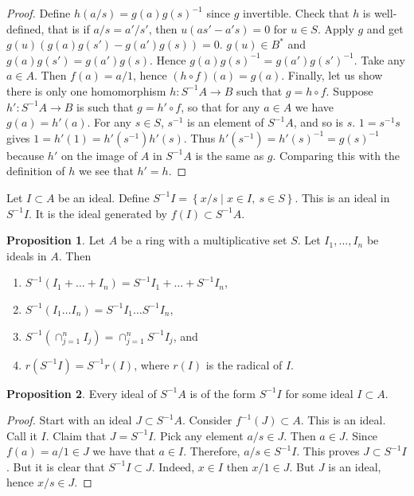 \documentclass{article}
\newcommand{\rb}[1]{\left( #1 \right)}
\newcommand{\cb}[1]{\left\{ #1 \right\}}
\theoremstyle{definition}\newtheorem{definition}{Definition}[section]
\theoremstyle{definition}\newtheorem{remark}[definition]{Remark}
\theoremstyle{definition}\newtheorem*{example}{Example}
\theoremstyle{definition}\newtheorem*{note}{Note}
\newtheorem{proposition}[definition]{Proposition}
\begin{document}
\begin{proof}
Define $ h\rb{a / s} = g\rb{a}g\rb{s}^{-1} $ since $ g $ invertible. Check that $ h $ is well-defined, that is if $ a / s = a' / s' $, then $ u\rb{as' - a's} = 0 $ for $ u \in S $. Apply $ g $ and get $ g\rb{u}\rb{g\rb{a}g\rb{s'} - g\rb{a'}g\rb{s}} = 0 $. $ g\rb{u} \in B^* $ and $ g\rb{a}g\rb{s'} = g\rb{a'}g\rb{s} $. Hence $ g\rb{a}g\rb{s}^{-1} = g\rb{a'}g\rb{s'}^{-1} $. Take any $ a \in A $. Then $ f\rb{a} = a / 1 $, hence $ \rb{h \circ f}\rb{a} = g\rb{a} $. Finally, let us show there is only one homomorphism $ h : S^{-1}A \to B $ such that $ g = h \circ f $. Suppose $ h' : S^{-1}A \to B $ is such that $ g = h' \circ f $, so that for any $ a \in A $ we have $ g\rb{a} = h'\rb{a} $. For any $ s \in S $, $ s^{-1} $ is an element of $ S^{-1}A $, and so is $ s $. $ 1 = s^{-1}s $ gives $ 1 = h'\rb{1} = h'\rb{s^{-1}}h'\rb{s} $. Thus $ h'\rb{s^{-1}} = h'\rb{s}^{-1} = g\rb{s}^{-1} $ because $ h' $ on the image of $ A $ in $ S^{-1}A $ is the same as $ g $. Comparing this with the definition of $ h $ we see that $ h' = h $.
\end{proof}

Let $ I \subset A $ be an ideal. Define $ S^{-1}I = \cb{x / s \mid x \in I, \ s \in S} $. This is an ideal in $ S^{-1}I $. It is the ideal generated by $ f\rb{I} \subset S^{-1}A $.

\begin{proposition}
Let $ A $ be a ring with a multiplicative set $ S $. Let $ I_1, \dots, I_n $ be ideals in $ A $. Then
\begin{enumerate}
\item $ S^{-1}\rb{I_1 + \dots + I_n} = S^{-1}I_1 + \dots + S^{-1}I_n $,
\item $ S^{-1}\rb{I_1 \dots I_n} = S^{-1}I_1 \dots S^{-1}I_n $,
\item $ S^{-1}\rb{\cap_{j = 1}^n I_j} = \cap_{j = 1}^n S^{-1}I_j $, and
\item $ r\rb{S^{-1}I} = S^{-1}r\rb{I} $, where $ r\rb{I} $ is the radical of $ I $.
\end{enumerate}
\end{proposition}

\begin{proposition}
\label{prop:6.8}
Every ideal of $ S^{-1}A $ is of the form $ S^{-1}I $ for some ideal $ I \subset A $.
\end{proposition}

\begin{proof}
Start with an ideal $ J \subset S^{-1}A $. Consider $ f^{-1}\rb{J} \subset A $. This is an ideal. Call it $ I $. Claim that $ J = S^{-1}I $. Pick any element $ a / s \in J $. Then $ a \in J $. Since $ f\rb{a} = a / 1 \in J $ we have that $ a \in I $. Therefore, $ a / s \in S^{-1}I $. This proves $ J \subset S^{-1}I $. But it is clear that $ S^{-1}I \subset J $. Indeed, $ x \in I $ then $ x / 1 \in J $. But $ J $ is an ideal, hence $ x / s \in J $.
\end{proof}
\end{document}

